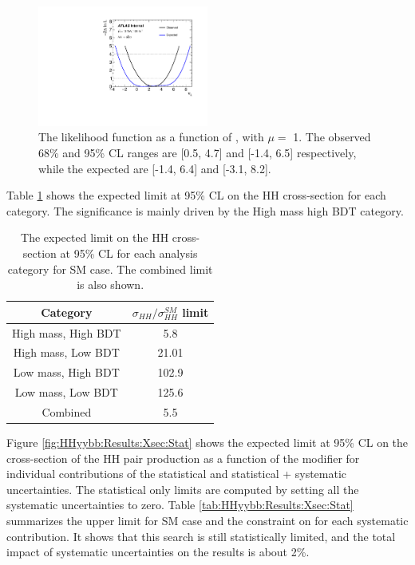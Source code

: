 \begin{figure}[htbp]
    \centering
    \includegraphics[width=0.5\textwidth]{Ch5/Img/figures_Results_scan_hhyybb_kl.pdf}
    \caption{The likelihood function as a function of \kl, with $\mu = $  1. The observed 68\% and 95\% CL ranges are [0.5, 4.7] and [-1.4, 6.5] respectively, while the expected are [-1.4, 6.4] and [-3.1, 8.2].}
    \label{fig:HHyybb:Results:Xsec:LH}
\end{figure}

Table \ref{tab:HHyybb:Results:Xsec:Cat} shows the expected limit at 95\% CL on the HH cross-section for each category. The significance is mainly driven by the High mass high BDT category. 

\begin{table}[htbp]
    \centering
    \begin{tabular}{cc}
        \hline\hline
        Category &  $\sigma_{HH}/\sigma_{HH}^{SM}$ limit \\
        \hline
        High mass, High BDT &  5.8 \\
        High mass, Low BDT &  21.01  \\
        Low mass, High BDT &  102.9 \\
        Low mass, Low BDT  &  125.6 \\
        \hline 
        Combined & 5.5 \\
        \hline\hline
    \end{tabular}
    \begin{tcolorbox}[colback=black!5!white,colframe=white!75!black]
    \caption{The expected limit on the HH cross-section at 95\% CL for each analysis category for SM case. The combined limit is also shown.}
    \label{tab:HHyybb:Results:Xsec:Cat}
    \end{tcolorbox}
\end{table}

Figure \ref{fig:HHyybb:Results:Xsec:Stat} shows the expected limit at 95\% CL on the cross-section of the HH pair production as a function of the \kl modifier for individual contributions of the statistical and statistical + systematic uncertainties. The statistical only limits are computed by setting all the systematic uncertainties to zero. Table \ref{tab:HHyybb:Results:Xsec:Stat} summarizes the upper limit for SM case and the constraint on \kl for each systematic contribution. It shows that this search is still statistically limited, and the total impact of systematic uncertainties on the results is about 2\%.

